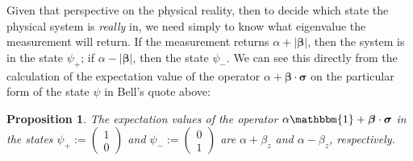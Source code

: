 \documentclass[12pt]{article}
\newtheorem{prop}[thm]{Proposition}
\begin{document}
Given that perspective on the physical reality, then to decide which
state the physical system is \emph{really} in, we need simply to know
what eigenvalue the measurement will return. If the measurement
returns $\alpha + |\bm{\beta}|$, then the system is in the state
$\psi_{+}$; if $\alpha - |\bm{\beta}|$, then the state $\psi_{-}$. We
can see this directly from the calculation of the expectation value of
the operator $\alpha + \bm{\beta} \cdot \bm{\sigma}$ on the particular
form of the state $\psi$ in Bell's quote above:

\begin{prop}
  The expectation values of the operator $\alpha \mathbbm{1} +
\bm{\beta} \cdot \bm{\sigma}$ in the states $\psi_{+}
:= \begin{pmatrix} 1 \\ 0 \end{pmatrix}$ and $\psi_{-}
:= \begin{pmatrix} 0 \\ 1 \end{pmatrix}$ are $\alpha + \beta_z$ and
  $\alpha - \beta_z$, respectively.
\end{prop}
\end{document}
